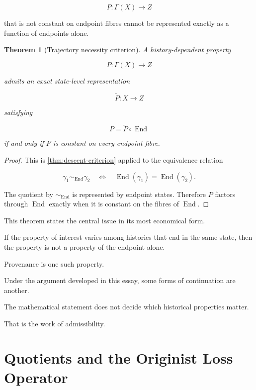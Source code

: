 \documentclass[
  11pt,
  a4paper,
  DIV=12,
  BCOR=0mm,
  parskip=half-
]{scrartcl}
\newcommand{\End}{\operatorname{End}}
\theoremstyle{definition}
\theoremstyle{plain}
\newtheorem{theorem}[definition]{Theorem}
\theoremstyle{remark}
\begin{document}
\[
  P:\Gamma(X)\to Z
\]

that is not constant on endpoint fibres cannot be represented exactly as a
function of endpoints alone.

\begin{theorem}[Trajectory necessity criterion]
\label{thm:trajectory-necessity}
A history-dependent property

\[
  P:\Gamma(X)\to Z
\]

admits an exact state-level representation

\[
  \widetilde P:X\to Z
\]

satisfying

\[
  P=\widetilde P\circ\End
\]

if and only if \(P\) is constant on every endpoint fibre.
\end{theorem}

\begin{proof}
This is \cref{thm:descent-criterion} applied to the equivalence relation

\[
  \gamma_1\sim_{\End}\gamma_2
  \quad\Longleftrightarrow\quad
  \End(\gamma_1)=\End(\gamma_2).
\]

The quotient by \(\sim_{\End}\) is represented by endpoint states. Therefore
\(P\) factors through \(\End\) exactly when it is constant on the fibres of
\(\End\).
\end{proof}

This theorem states the central issue in its most economical form.

If the property of interest varies among histories that end in the same state,
then the property is not a property of the endpoint alone.

Provenance is one such property.

Under the argument developed in this essay, some forms of continuation are
another.

The mathematical statement does not decide which historical properties matter.

That is the work of admissibility.


\section{Quotients and the Originist Loss Operator}
\label{app:originist-loss}
\end{document}
